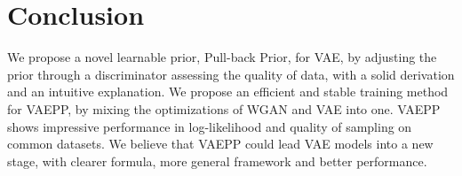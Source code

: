 \section{Conclusion}

We propose a novel learnable prior, Pull-back Prior, for VAE, by adjusting the prior through a discriminator assessing the quality of data, with a solid derivation and an intuitive explanation. We propose an efficient and stable training method for VAEPP, by mixing the optimizations of WGAN and VAE into one. VAEPP shows impressive performance in log-likelihood and quality of sampling on common datasets. We believe that VAEPP could lead VAE models into a new stage, with clearer formula, more general framework and better performance. 